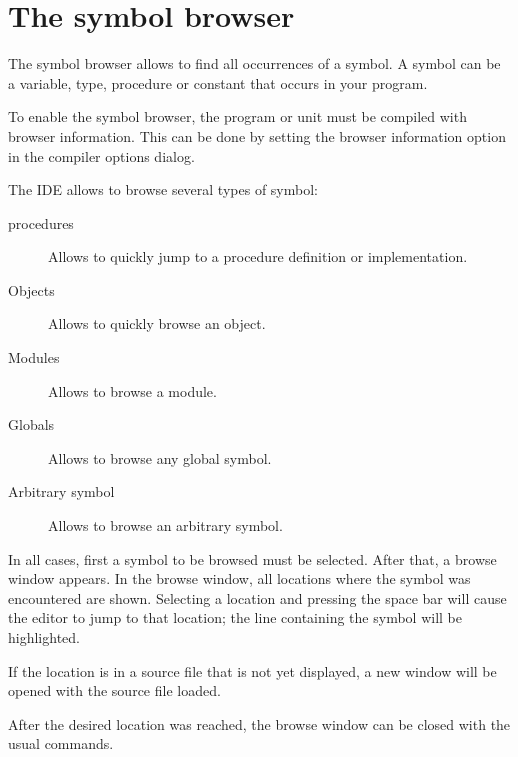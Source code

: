 \section{The symbol browser}
\label{se:browser}
The symbol browser allows to find all occurrences of a symbol. A symbol 
can be a variable, type, procedure or constant that occurs in your program.

To enable the symbol browser, the program or unit must be compiled with
browser information. This can be done by setting the browser information
option in the compiler options dialog.

The IDE allows to browse several types of symbol:
\begin{description}
\item[procedures] Allows to quickly jump to a procedure definition or
implementation.
\item[Objects] Allows to quickly browse an object.
\item[Modules] Allows to browse a module.
\item[Globals] Allows to browse any global symbol.
\item[Arbitrary symbol] Allows to browse an arbitrary symbol.
\end{description}
In all cases, first a symbol to be browsed must be selected. After that,
a browse window appears. In the browse window, all locations where the 
symbol was encountered are shown. Selecting a location and pressing the
space bar will cause the editor to jump to that location; the line
containing the symbol will be highlighted. 

If the location is in a source file that is not yet displayed, a new 
window will be opened with the source file loaded.

After the desired location was reached, the browse window can be closed 
with the usual commands. 

